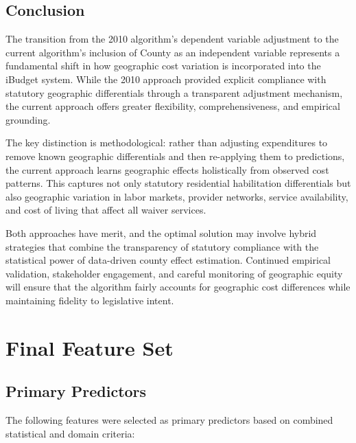 \subsection{Conclusion}
\label{subsec:county-conclusion}

The transition from the 2010 algorithm's dependent variable adjustment to the current algorithm's inclusion of County as an independent variable represents a fundamental shift in how geographic cost variation is incorporated into the iBudget system. While the 2010 approach provided explicit compliance with statutory geographic differentials through a transparent adjustment mechanism, the current approach offers greater flexibility, comprehensiveness, and empirical grounding.

The key distinction is methodological: rather than adjusting expenditures to remove known geographic differentials and then re-applying them to predictions, the current approach learns geographic effects holistically from observed cost patterns. This captures not only statutory residential habilitation differentials but also geographic variation in labor markets, provider networks, service availability, and cost of living that affect all waiver services.

Both approaches have merit, and the optimal solution may involve hybrid strategies that combine the transparency of statutory compliance with the statistical power of data-driven county effect estimation. Continued empirical validation, stakeholder engagement, and careful monitoring of geographic equity will ensure that the algorithm fairly accounts for geographic cost differences while maintaining fidelity to legislative intent.



\section{Final Feature Set}
\label{sec:final-feature-set}

\subsection{Primary Predictors}
\label{subsec:primary-predictors}

The following features were selected as primary predictors based on combined statistical and domain criteria:

